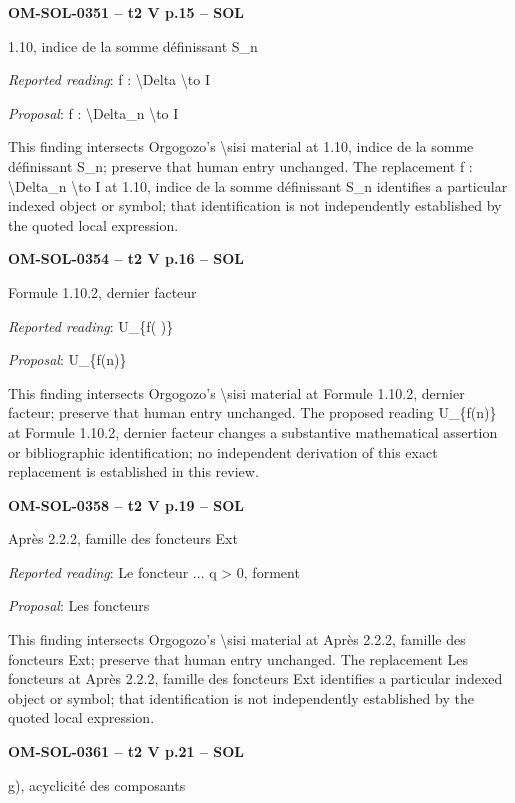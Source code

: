 \par\noindent\textbf{OM-SOL-0351 -- t2 V p.15 -- SOL}\par
1.10, indice de la somme définissant S\_n\par
\emph{Reported reading}: f : \textbackslash{}Delta \textbackslash{}to I\par
\emph{Proposal}: f : \textbackslash{}Delta\_n \textbackslash{}to I\par
This finding intersects Orgogozo's \textbackslash{}sisi material at 1.10, indice de la somme définissant S\_n; preserve that human entry unchanged. The replacement f : \textbackslash{}Delta\_n \textbackslash{}to I at 1.10, indice de la somme définissant S\_n identifies a particular indexed object or symbol; that identification is not independently established by the quoted local expression.\par
\par\noindent\textbf{OM-SOL-0354 -- t2 V p.16 -- SOL}\par
Formule 1.10.2, dernier facteur\par
\emph{Reported reading}: U\_\{f( )\}\par
\emph{Proposal}: U\_\{f(n)\}\par
This finding intersects Orgogozo's \textbackslash{}sisi material at Formule 1.10.2, dernier facteur; preserve that human entry unchanged. The proposed reading U\_\{f(n)\} at Formule 1.10.2, dernier facteur changes a substantive mathematical assertion or bibliographic identification; no independent derivation of this exact replacement is established in this review.\par
\par\noindent\textbf{OM-SOL-0358 -- t2 V p.19 -- SOL}\par
Après 2.2.2, famille des foncteurs Ext\par
\emph{Reported reading}: Le foncteur ... q > 0, forment\par
\emph{Proposal}: Les foncteurs\par
This finding intersects Orgogozo's \textbackslash{}sisi material at Après 2.2.2, famille des foncteurs Ext; preserve that human entry unchanged. The replacement Les foncteurs at Après 2.2.2, famille des foncteurs Ext identifies a particular indexed object or symbol; that identification is not independently established by the quoted local expression.\par
\par\noindent\textbf{OM-SOL-0361 -- t2 V p.21 -- SOL}\par
g), acyclicité des composants\par
